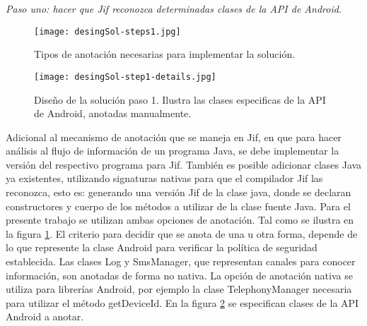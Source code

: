 \textit{Paso uno: hacer que Jif reconozca determinadas clases de la API de
Android}.

\begin{figure}[h!]
	\begin{center}
	\texttt{[image: desingSol-steps1.jpg]}
	\end{center}
	\caption{Tipos de anotación necesarias para implementar la solución.}
	\label{fig:desingSol-steps1}
\end{figure}

\begin{figure}[t!]
	\begin{center}
	\texttt{[image: desingSol-step1-details.jpg]}
	\end{center}
	\caption{Diseño de la solución paso 1. Ilustra las clases especificas de la
	API de Android, anotadas manualmente.}
	\label{fig:desingSol-details}
\end{figure}
Adicional al mecanismo de anotación que se maneja en Jif, en que para hacer
análisis al flujo de información de un programa Java, se debe implementar la
versión del respectivo programa para Jif. También es posible adicionar clases
Java ya existentes, utilizando signaturas nativas para que el compilador Jif las
reconozca, esto es: generando una versión Jif de la clase java, donde se
declaran constructores y cuerpo de los métodos a utilizar de la clase fuente
Java.\newline
Para el presente trabajo se utilizan ambas opciones de anotación. Tal como se
ilustra en la figura \ref{fig:desingSol-steps1}. 
El criterio para decidir que se anota de una u otra forma, depende de lo que
represente la clase Android para verificar la política de seguridad establecida.
Las clases Log y SmsManager, que representan canales para conocer información,
son anotadas de forma no nativa. La opción de anotación nativa se utiliza para
librerías Android, por ejemplo la clase TelephonyManager necesaria para utilizar
el método getDeviceId. En la figura \ref{fig:desingSol-details} se especifican
clases de la API Android a anotar.\newline

